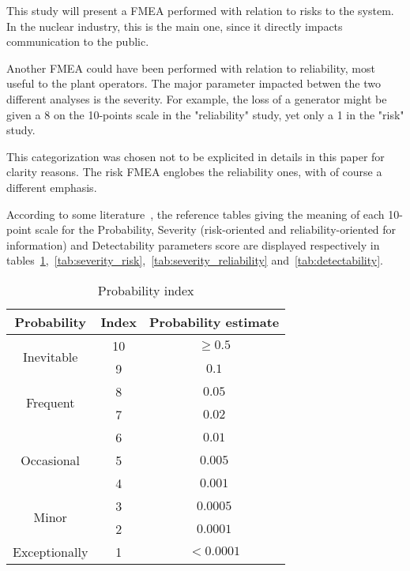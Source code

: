 This study will present a FMEA performed with relation to risks to the system. In the nuclear industry, this is the main one, since it directly impacts communication to the public.

Another FMEA could have been performed with relation to reliability, most useful to the plant operators. The major parameter impacted betwen the two different analyses is the severity. For example, the loss of a generator might be given a 8 on the 10-points scale in the "reliability" study, yet only a 1 in the "risk" study.

This categorization was chosen not to be explicited in details in this paper for clarity reasons. The risk FMEA englobes the reliability ones, with of course a different emphasis.

According to some literature~\cite{garcia2013}, the reference tables giving the meaning of each 10-point scale for the Probability, Severity (risk-oriented and reliability-oriented for information) and Detectability parameters score are displayed respectively in tables~\ref{tab:probability},~\ref{tab:severity_risk},~\ref{tab:severity_reliability} and~\ref{tab:detectability}.


\begin{table}[!htb]
    \centering
        \begin{tabular}{ ccc }
        \hline
        Probability & Index & Probability estimate \\ \hline\hline
        \multirow{2}{*}{Inevitable} & 10 & $\geq 0.5$\\
                                    & 9  & $0.1$ \\
        \multirow{2}{*}{Frequent}   & 8  & $0.05$\\
                                    & 7  & $0.02$ \\
        \multirow{3}{*}{Occasional}   & 6  & $0.01$\\
                                    & 5  & $0.005$ \\
                                    & 4  & $0.001$ \\
        \multirow{2}{*}{Minor}   & 3  & $0.0005$\\
                                    & 2  & $0.0001$ \\
        Exceptionally & 1  & $< 0.0001$ \\
                                     
        \end{tabular}
        \caption{Probability index}\label{tab:probability}
\end{table}

